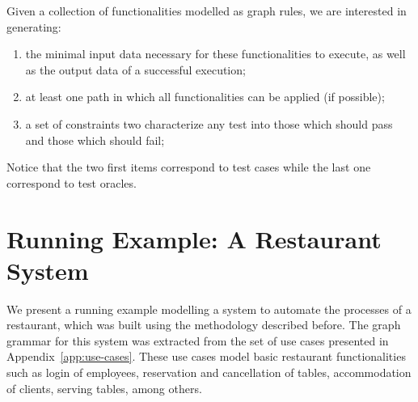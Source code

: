  Given a collection of functionalities modelled as graph rules, we are interested in generating:


\begin{enumerate}
\item the minimal input data necessary for these functionalities to execute, as well as the output data of a successful execution;
\item at least one path in which all functionalities can be applied (if possible);
\item a set of constraints two characterize any test into those which should pass and those which should fail;

\end{enumerate}

Notice that the two first items correspond to test cases while the last one correspond to test oracles.


\section{Running Example: A Restaurant System}

We present a running example modelling a system to automate the processes of a restaurant, which was built using the methodology described before. The graph grammar for this system was extracted from the set of use cases presented in Appendix~\ref{app:use-cases}. These use cases model basic restaurant functionalities such as login of employees, reservation and cancellation of tables, accommodation of clients, serving tables, among others.

